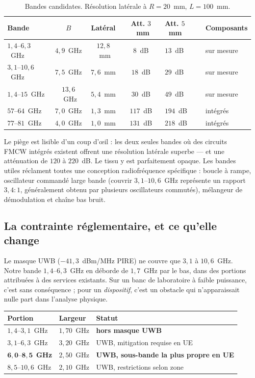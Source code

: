 \documentclass[11pt,a4paper]{article}
\begin{document}
\begin{table}[h]
\centering
\caption{Bandes candidates. Résolution latérale à $R = 20$~mm, $L = 100$~mm.}
\begin{tabular}{lcccll}
\toprule
Bande & $B$ & Latéral & Att. $3$~mm & Att. $5$~mm & Composants \\
\midrule
$1{,}4$--$6{,}3$~GHz & $4{,}9$~GHz & $12{,}8$~mm & $8$~dB & $13$~dB
  & sur mesure \\
$3{,}1$--$10{,}6$~GHz & $7{,}5$~GHz & $7{,}6$~mm & $18$~dB & $29$~dB
  & sur mesure \\
$1{,}4$--$15$~GHz & $13{,}6$~GHz & $5{,}4$~mm & $30$~dB & $49$~dB
  & sur mesure \\
$57$--$64$~GHz & $7{,}0$~GHz & $1{,}3$~mm & $117$~dB & $194$~dB
  & intégrés \\
$77$--$81$~GHz & $4{,}0$~GHz & $1{,}0$~mm & $131$~dB & $218$~dB
  & intégrés \\
\bottomrule
\end{tabular}
\end{table}

Le piège est lisible d'un coup d'\oe il : les deux seules bandes où des circuits
FMCW intégrés existent offrent une résolution latérale superbe --- et une
atténuation de $120$ à $220$~dB. Le tissu y est parfaitement opaque. Les bandes
utiles réclament toutes une conception radiofréquence spécifique : boucle à
rampe, oscillateur commandé large bande (couvrir $3{,}1$--$10{,}6$~GHz
représente un rapport $3{,}4{:}1$, généralement obtenu par plusieurs
oscillateurs commutés), mélangeur de démodulation et chaîne bas bruit.

\subsection{La contrainte réglementaire, et ce qu'elle change}
\label{sec:reglementaire}

Le masque UWB ($-41{,}3$~dBm/MHz PIRE) ne couvre que $3{,}1$ à $10{,}6$~GHz.
Notre bande $1{,}4$--$6{,}3$~GHz en déborde de $1{,}7$~GHz par le bas, dans des
portions attribuées à des services existants. Sur un banc de laboratoire à
faible puissance, c'est sans conséquence ; pour un \emph{dispositif}, c'est un
obstacle qui n'apparaissait nulle part dans l'analyse physique.

\begin{table}[h]
\centering
\begin{tabular}{lll}
\toprule
Portion & Largeur & Statut \\
\midrule
$1{,}4$--$3{,}1$~GHz & $1{,}70$~GHz & \textbf{hors masque UWB} \\
$3{,}1$--$6{,}3$~GHz & $3{,}20$~GHz & UWB, mitigation requise en UE \\
$\mathbf{6{,}0}$--$\mathbf{8{,}5}$~\textbf{GHz} & $2{,}50$~GHz
  & \textbf{UWB, sous-bande la plus propre en UE} \\
$8{,}5$--$10{,}6$~GHz & $2{,}10$~GHz & UWB, restrictions selon zone \\
\bottomrule
\end{tabular}
\end{table}
\end{document}
